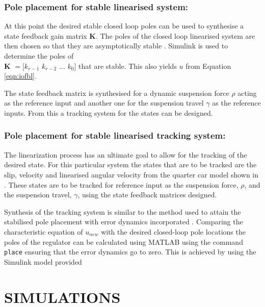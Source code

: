 \documentclass[10pt,twocolumn]{witseiepaper}
\begin{document}
\subsubsection*{Pole placement for stable linearised system: }

At this point the desired stable closed loop poles can be used to synthesise a state feedback gain matrix \textbf{K}. The poles of the closed loop linearised system are then chosen so that they are asymptotically stable \cite{Nyandoro2:2011}. Simulink is used to determine the poles of \\ \textbf{K} $= [k_{r-1}$ $k_{r-2}$ $...$ $k_0]$ that are stable. This also yields $u$ from Equation \ref{eqn:iofbl}. 

The state feedback matrix is synthesised for a dynamic suspension force $\rho$ acting as the reference input and another one for the suspension travel $\gamma$ as the reference inputs. From this a tracking system for the states can be designed.

\subsubsection*{Pole placement for stable linearised tracking system: }

The linearization process has an ultimate goal to allow for the tracking of the desired state. For this particular system the states that are to be tracked are the slip, velocity and linearised angular velocity from the quarter car model shown in . These states are to be tracked for reference input as the suspension force, $\rho$, and the suspension travel, $\gamma$, using the state feedback matrices designed. 

Synthesis of the tracking system is similar to the method used to attain the stabilised pole placement with error dynamics incorporated \cite{Nyandoro2:2011}. Comparing the characteristic equation of $u_{new}$ with the desired closed-loop pole locations the poles of the regulator can be calculated using MATLAB using the command \verb|place| ensuring that the error dynamics go to zero. This is achieved by using the Simulink model provided

\section{SIMULATIONS}
\end{document}
